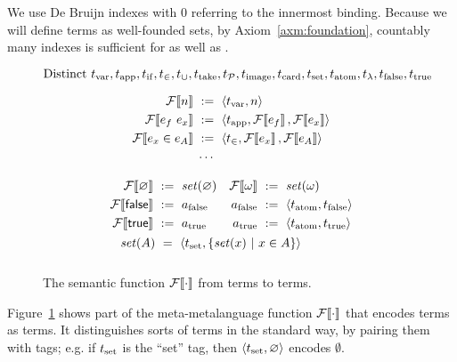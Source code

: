 We use De Bruijn indexes with $0$ referring to the innermost binding. Because we will define \targetlang terms as well-founded sets, by Axiom~\ref{axm:foundation}, countably many indexes is sufficient for \targetlang as well as \ftargetlang.

\begin{figure*}[tb]\centering
\begin{equation*}
\text{Distinct }\tvar,\tapp,\tif,\tin,\tunion,\ttake,\tpowerset,\timage,\torder,\tset,\tatom,\tfun,\tfalse,\ttrue \vspace{-\baselineskip}
\end{equation*}
\begin{varwidth}[t]{\textwidth}
\begin{equation*}
\begin{aligned}
	\mathcal{F}\!\left\llbracket{n}\right\rrbracket &\ :=\ \langle{t_\mathrm{var},n}\rangle \\
	\mathcal{F}\!\left\llbracket{{e_f}\ {e_x}}\right\rrbracket &\ :=\ \langle{t_\mathrm{app},\mathcal{F}\!\left\llbracket{e_f}\right\rrbracket,\mathcal{F}\!\left\llbracket{e_x}\right\rrbracket}\rangle \\
	\mathcal{F}\!\left\llbracket{e_x \in e_A}\right\rrbracket &\ :=\ \langle{t_\in,\mathcal{F}\!\left\llbracket{e_x}\right\rrbracket,\mathcal{F}\!\left\llbracket{e_A}\right\rrbracket}\rangle \\
	&\;\cdots
\end{aligned}
\end{equation*}
\end{varwidth}
\hspace{0.09in}
%
\begin{varwidth}[t]{\textwidth}
\begin{equation*}
\begin{aligned}
&\begin{aligned}
	\mathcal{F}\!\left\llbracket{\varnothing}\right\rrbracket &\ :=\ \mathit{set}(\varnothing) &
\mathcal{F}\!\left\llbracket{\omega}\right\rrbracket &\ :=\ \mathit{set}(\omega) \\
	\mathcal{F}\!\left\llbracket{\mathsf{false}}\right\rrbracket &\ :=\ a_\mathrm{false} &
a_\mathrm{false} &\ :=\ \langle{t_\mathrm{atom},t_\mathrm{false}}\rangle \\
	\mathcal{F}\!\left\llbracket{\mathsf{true}}\right\rrbracket &\ :=\ a_\mathrm{true} &
a_\mathrm{true} &\ :=\ \langle{t_\mathrm{atom},t_\mathrm{true}}\rangle
\end{aligned} \\
	&\ \ \,\mathit{set}(A) \ =\ \langle{t_\mathrm{set}, \lbrace {\mathit{set}(x)} \ \lvert\ {x \in A} \rbrace}\rangle
	\\[0.5\baselineskip]
\end{aligned}
\end{equation*}
\end{varwidth}
\bottomhrule
\caption[Semantic function $\enc{\cdot}$]{The semantic function $\enc{\cdot}$ from \ftargetlang terms to \targetlang terms.}
\label{fig:encoding}
\end{figure*}

Figure~\ref{fig:encoding} shows part of the meta-metalanguage function $\mathcal{F}\!\left\llbracket{\cdot}\right\rrbracket$ that encodes \ftargetlang terms as \targetlang terms. It distinguishes sorts of terms in the standard way, by pairing them with tags; e.g. if $t_\mathrm{set}$ is the ``set'' tag, then $\langle{t_\mathrm{set},\varnothing}\rangle$ encodes $\emptyset$.

